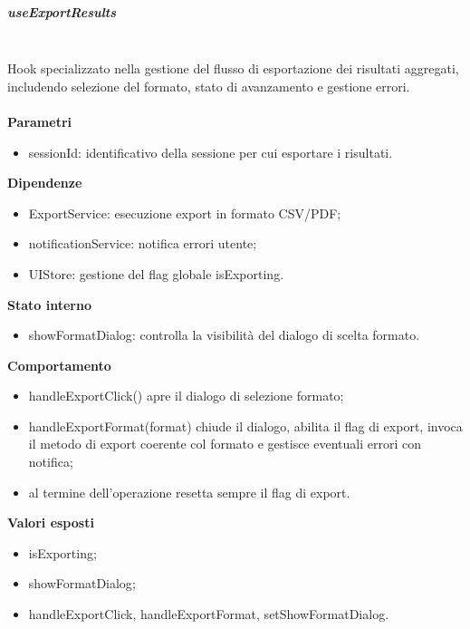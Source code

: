 \documentclass[a4paper,12pt]{article}
\begin{document}
                \subparagraph{useExportResults}\mbox{}\\
                Hook specializzato nella gestione del flusso di esportazione dei risultati aggregati, includendo selezione del formato, stato di avanzamento e gestione errori.\\\\
                \textbf{Parametri}
                \begin{itemize}
                    \item {\ttfamily sessionId}: identificativo della sessione per cui esportare i risultati.
                \end{itemize}
                \textbf{Dipendenze}
                \begin{itemize}
                    \item {\ttfamily ExportService}: esecuzione export in formato CSV/PDF;
                    \item {\ttfamily notificationService}: notifica errori utente;
                    \item {\ttfamily UIStore}: gestione del flag globale {\ttfamily isExporting}.
                \end{itemize}
                \textbf{Stato interno}
                \begin{itemize}
                    \item {\ttfamily showFormatDialog}: controlla la visibilità del dialogo di scelta formato.
                \end{itemize}
                \textbf{Comportamento}
                \begin{itemize}
                    \item {\ttfamily handleExportClick()} apre il dialogo di selezione formato;
                    \item {\ttfamily handleExportFormat(format)} chiude il dialogo, abilita il flag di export, invoca il metodo di export coerente col formato e gestisce eventuali errori con notifica;
                    \item al termine dell'operazione resetta sempre il flag di export.
                \end{itemize}
                \textbf{Valori esposti}
                \begin{itemize}
                    \item {\ttfamily isExporting};
                    \item {\ttfamily showFormatDialog};
                    \item {\ttfamily handleExportClick}, {\ttfamily handleExportFormat}, {\ttfamily setShowFormatDialog}.
                \end{itemize}
\end{document}
